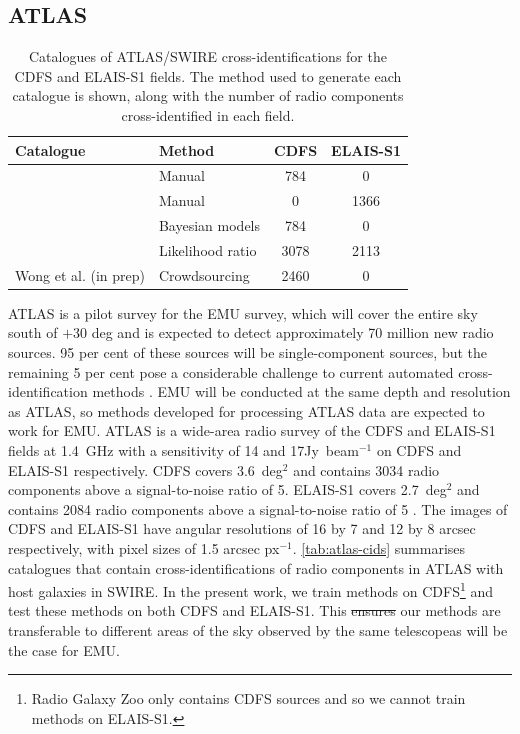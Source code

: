 \documentclass[11pt, a4paper]{book}
\newcommand{\jansky}{Jy}
\providecommand{\DIFaddtex}[1]{{\protect\color{blue}\uwave{#1}}} %
\providecommand{\DIFdeltex}[1]{{\protect\color{red}\sout{#1}}}                      %
\providecommand{\DIFaddbegin}{} %
\providecommand{\DIFaddend}{} %
\providecommand{\DIFdelbegin}{} %
\providecommand{\DIFdelend}{} %
\providecommand{\DIFaddFL}[1]{\DIFadd{#1}} %
\providecommand{\DIFaddbeginFL}{} %
\providecommand{\DIFaddendFL}{} %
\providecommand{\DIFadd}[1]{\texorpdfstring{\DIFaddtex{#1}}{#1}} %
\providecommand{\DIFdel}[1]{\texorpdfstring{\DIFdeltex{#1}}{}} %
\newcommand{\DIFscaledelfig}{0.5}
\newlength{\DIFdelgraphicswidth} %
\newlength{\DIFdelgraphicsheight} %
\newcommand{\DIFaddincludegraphics}[2][]{{\color{blue}\fbox{\DIFOincludegraphics[#1]{#2}}}} %
\newcommand{\DIFdelincludegraphics}[2][]{%
\sbox{\DIFdelgraphicsbox}{\DIFOincludegraphics[#1]{#2}}%
\settoboxwidth{\DIFdelgraphicswidth}{\DIFdelgraphicsbox} %
\settoboxtotalheight{\DIFdelgraphicsheight}{\DIFdelgraphicsbox} %
\scalebox{\DIFscaledelfig}{%
\parbox[b]{\DIFdelgraphicswidth}{\usebox{\DIFdelgraphicsbox}\\[-\baselineskip] \rule{\DIFdelgraphicswidth}{0em}}\llap{\resizebox{\DIFdelgraphicswidth}{\DIFdelgraphicsheight}{%
\setlength{\unitlength}{\DIFdelgraphicswidth}%
\begin{picture}(1,1)%
\thicklines\linethickness{2pt} %
{\color[rgb]{1,0,0}\put(0,0){\framebox(1,1){}}}%
{\color[rgb]{1,0,0}\put(0,0){\line( 1,1){1}}}%
{\color[rgb]{1,0,0}\put(0,1){\line(1,-1){1}}}%
\end{picture}%
}\hspace*{3pt}}} %
} %
\DeclareRobustCommand{\DIFaddbegin}{\DIFOaddbegin \let\includegraphics\DIFaddincludegraphics} %
\DeclareRobustCommand{\DIFaddend}{\DIFOaddend \let\includegraphics\DIFOincludegraphics} %
\DeclareRobustCommand{\DIFdelbegin}{\DIFOdelbegin \let\includegraphics\DIFdelincludegraphics} %
\DeclareRobustCommand{\DIFdelend}{\DIFOaddend \let\includegraphics\DIFOincludegraphics} %
\DeclareRobustCommand{\DIFaddbeginFL}{\DIFOaddbeginFL \let\includegraphics\DIFaddincludegraphics} %
\DeclareRobustCommand{\DIFaddendFL}{\DIFOaddendFL \let\includegraphics\DIFOincludegraphics} %
\begin{document}
  \subsection{ATLAS}\label{sec:atlas-xid-atlas}
    \begin{table}
      \caption[Catalogues of ATLAS/SWIRE cross-identifications for the CDFS
        and ELAIS-S1 fields.]{Catalogues of ATLAS/SWIRE cross-identifications for the CDFS
        and ELAIS-S1 fields. The method used to generate each catalogue is
        shown, along with the number of radio components cross-identified in each
        field.}
      \centering
      \label{tab:atlas-cids}
      \begin{tabular}{llcc}
        \hline\hline
        Catalogue & Method & CDFS & ELAIS-S1\\
        \hline
        \citet{norris06} & Manual & 784 & 0\\
        \citet{middelberg08} & Manual & 0 & 1366\\
        \citet{fan15} & Bayesian models & 784 & 0\\
        \citet{weston18lrpy} & Likelihood ratio & 3078 & 2113\\
        Wong et al. (in prep\DIFaddbeginFL \DIFaddFL{.}\DIFaddendFL ) & Crowdsourcing & 2460 & 0 \\
        \hline\hline
      \end{tabular}
    \end{table}

    ATLAS is a pilot survey for the EMU \citep{norris11} survey, which will
    cover the entire sky south of $+30$ deg and is expected to detect
    approximately 70 million new radio sources. {95 per cent of these sources
    will be single-component sources, but the remaining 5 per cent pose a
    considerable challenge to current automated cross-identification methods
    \citep{norris11}.} EMU will be conducted at the same depth and resolution
    as ATLAS, so methods developed for processing ATLAS data are expected to
    work for EMU. ATLAS is a wide-area radio survey of the CDFS and ELAIS-S1
    fields at 1.4~GHz with a sensitivity of 14 and
    \unit{17}{\micro\jansky}~beam$^{-1}$ on CDFS and ELAIS-S1 respectively.
    CDFS covers 3.6~deg$^2$ and contains 3034 radio components above a
    signal-to-noise ratio of 5. ELAIS-S1 covers 2.7~deg$^2$ and contains 2084
    radio components above a signal-to-noise ratio of 5 \citep{franzen15}. The
    images of CDFS and ELAIS-S1 have angular resolutions of 16 by 7 and 12 by
    8 arcsec respectively, with pixel sizes of 1.5 arcsec px$^{-1}$.
    \autoref{tab:atlas-cids} summarises catalogues that contain
    cross-identifications of radio components in ATLAS with host galaxies in
    SWIRE. In the present work, we train methods on
    CDFS\footnote{{Radio Galaxy Zoo only contains CDFS sources and so
    we cannot train methods on ELAIS-S1.}} and test these methods on both CDFS
    and ELAIS-S1. This \DIFdelbegin \DIFdel{ensures }\DIFdelend \DIFaddbegin \DIFadd{helps confirm that }\DIFaddend our methods are transferable to different
    areas of the sky observed by the same telescope\DIFaddbegin \DIFadd{, }\DIFaddend as will be the case for
    EMU.
\end{document}
